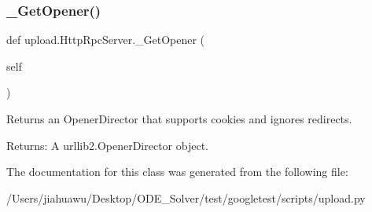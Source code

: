\subsubsection{\texorpdfstring{\+\_\+\+Get\+Opener()}{\_GetOpener()}}
{\footnotesize\ttfamily def upload.\+Http\+Rpc\+Server.\+\_\+\+Get\+Opener (\begin{DoxyParamCaption}\item[{}]{self }\end{DoxyParamCaption})\hspace{0.3cm}{\ttfamily [private]}}

\begin{DoxyVerb}Returns an OpenerDirector that supports cookies and ignores redirects.

Returns:
  A urllib2.OpenerDirector object.
\end{DoxyVerb}
 

The documentation for this class was generated from the following file\+:\begin{DoxyCompactItemize}
\item 
/\+Users/jiahuawu/\+Desktop/\+O\+D\+E\+\_\+\+Solver/test/googletest/scripts/upload.\+py\end{DoxyCompactItemize}
